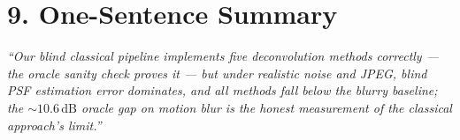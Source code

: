 \documentclass[10pt,a4paper]{article}
\begin{document}
\section*{9. One-Sentence Summary}
\emph{``Our blind classical pipeline implements five deconvolution methods
correctly --- the oracle sanity check proves it --- but under realistic noise
and JPEG, blind PSF estimation error dominates, and all methods fall below the
blurry baseline; the $\sim 10.6\,\text{dB}$ oracle gap on motion blur is the
honest measurement of the classical approach's limit.''}
\end{document}
